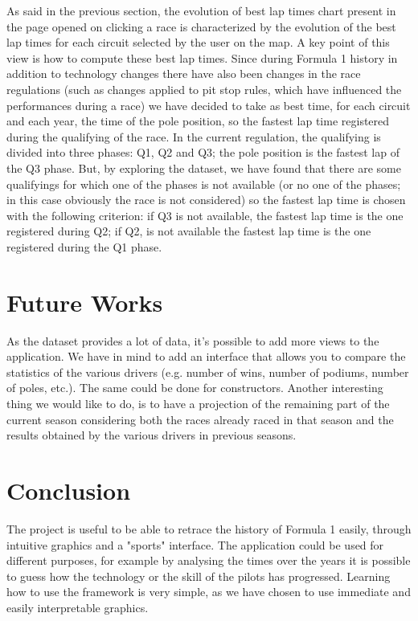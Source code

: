 \documentclass[11pt,twocolumn,letterpaper]{article}
\begin{document}
As said in the previous section, the evolution of best lap times chart present in the page opened on clicking a race is characterized by the evolution of the best lap times for each circuit selected by the user on the map. A key point of this view is how to compute these best lap times. Since during Formula 1 history in addition to technology changes there have also been changes in the race regulations (such as changes applied to pit stop rules, which have influenced the performances during a race) we have decided to take as best time, for each circuit and each year, the time of the pole position, so the fastest lap time registered during the qualifying of the race. In the current regulation, the qualifying is divided into three phases: Q1, Q2 and Q3; the pole position is the fastest lap of the Q3 phase. But, by exploring the dataset, we have found that there are some qualifyings for which one of the phases is not available (or no one of the phases; in this case obviously the race is not considered) so the fastest lap time is chosen with the following criterion: if Q3 is not available, the fastest lap time is the one registered during Q2; if Q2, is not available the fastest lap time is the one registered during the Q1 phase.

\section{Future Works}
As the dataset provides a lot of data, it's possible to add more views to the application. We have in mind to add an interface that allows you to compare the statistics of the various drivers (e.g. number of wins, number of podiums, number of poles, etc.). The same could be done for constructors. Another interesting thing we would like to do, is to have a projection of the remaining part of the current season considering both the races already raced in that season and the results obtained by the various drivers in previous seasons.

\section{Conclusion}
The project is useful to be able to retrace the history of Formula 1 easily, through intuitive graphics and a "sports" interface. The application could be used for different purposes, for example by analysing the times over the years it is possible to guess how the technology or the skill of the pilots has progressed. Learning how to use the framework is very simple, as we have chosen to use immediate and easily interpretable graphics. 
\end{document}
